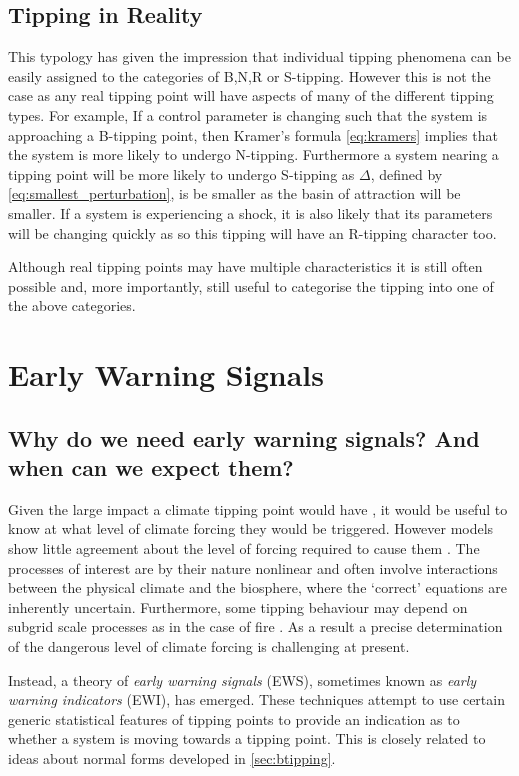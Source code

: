\subsection{Tipping in Reality}
This typology has given the impression that individual tipping phenomena can be easily assigned to the categories of B,N,R or S-tipping. However this is not the case as any
real tipping point will have aspects of many of the different tipping types. For example, If a control parameter is changing such that the system is approaching a B-tipping point,
then Kramer's formula \cref{eq:kramers} implies that the system is more likely to undergo N-tipping. Furthermore a system nearing a tipping point will be more likely to undergo S-tipping as
$\Delta$, defined by \cref{eq:smallest_perturbation}, is be smaller as the basin of attraction will be smaller. If a system is experiencing a shock, it is also likely that its parameters will
be changing quickly as so this tipping will have an R-tipping character too.

Although real tipping points may have multiple characteristics it is still often possible and, more importantly, still useful to categorise the tipping into one of the above categories.


\section{Early Warning Signals}
\subsection{Why do we need early warning signals? And when can we expect them?}
Given the large impact a climate tipping point would have \parencite{}, it would be useful to know at what level of climate forcing they would be triggered.
However models show little agreement about the level of forcing required to cause them \parencite{Drijfhout2015}. The processes of interest are by their nature
nonlinear and often involve interactions between the physical climate and the biosphere, where the `correct' equations are inherently uncertain. Furthermore,
some tipping behaviour may depend on subgrid scale processes as in the case of fire \parencite{}. As a result a precise determination of the dangerous level of climate
forcing is challenging at present.

Instead, a theory of \emph{early warning signals} (EWS), sometimes known as  \emph{early warning indicators} (EWI), has emerged. These techniques attempt to use certain
generic statistical features of tipping points to provide an indication as to whether a system is moving towards a tipping point. This is closely related to ideas about normal
forms developed in \cref{sec:btipping}.

